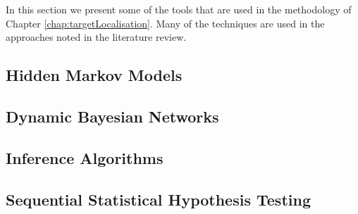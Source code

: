 

In this section we present some of the tools that are used in the methodology of Chapter \ref{chap:targetLocalisation}. Many of the techniques are used in the approaches noted in the literature review.


\subsection{Hidden Markov Models}\label{subsec:BGHMM}


\subsection{Dynamic Bayesian Networks}\label{subsec:BGDBN}


\subsection{Inference Algorithms}\label{subsec:BGInfAlgos}


%

\subsection{Sequential Statistical Hypothesis Testing}\label{subsec:SPRT}


%